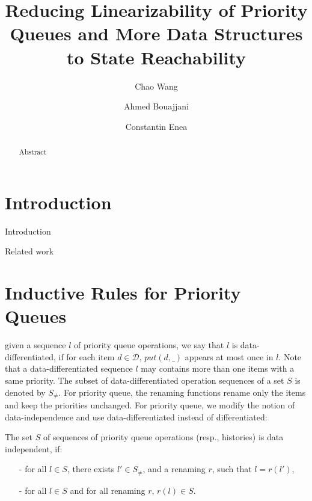 \documentclass{llncs}
\title{Reducing Linearizability of Priority Queues and More Data Structures to State Reachability}
\author {Chao Wang \and Ahmed Bouajjani \and Constantin Enea}
\institute{Institut de Recherche en Informatique Fondamentale, \\Univ. Paris Diderot (Paris 7)
}
\newcommand{\forget}[1]{}
\begin{document}
\maketitle

\begin{abstract}
Abstract
\end{abstract}

\forget{
\noindent Keywords: weak memory model, $\textit{linearizability}$,
$\textit{TSO-to-TSO linearizability}$
}



\section{Introduction}
\label{sec:introduction}
Introduction


\smallskip

\noindent Related work



\section{Inductive Rules for Priority Queues}
\label{sec:inductive rules for priority queues}

given a sequence $l$ of priority queue operations, we say that $l$ is data-differentiated, if for each item $d \in \mathcal{D}$, $\textit{put}(d,\_)$ appears at most once in $l$. Note that a data-differentiated sequence $l$ may contains more than one items with a same priority. The subset of data-differentiated operation sequences of a set $S$ is denoted by $S_{\neq}$. For priority queue, the renaming functions rename only the items and keep the priorities unchanged. For priority queue, we modify the notion of data-independence \cite{Wolper:1986} and use data-differentiated instead of differentiated:

\begin{definition}\label{def:priority-value data-independence}
The set $S$ of sequences of priority queue operations (resp., histories)  is data independent, if:
\begin{itemize}
\setlength{\itemsep}{0.5pt}
\item[-] for all $l \in S$, there exists $l' \in S_{\neq}$, and a renaming $r$, such that $l=r(l')$,

\item[-] for all $l \in S$ and for all renaming $r$, $r(l) \in S$.
\end{itemize}
\end{definition}
\end{document}
